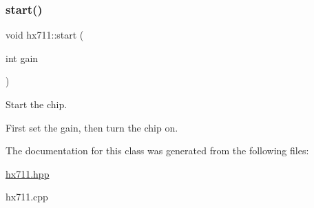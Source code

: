 \subsubsection{\texorpdfstring{start()}{start()}\hspace{0.1cm}{\footnotesize\ttfamily [2/2]}}
{\footnotesize\ttfamily void hx711\+::start (\begin{DoxyParamCaption}\item[{int}]{gain }\end{DoxyParamCaption})\hspace{0.3cm}{\ttfamily [virtual]}}



Start the chip. 

First set the gain, then turn the chip on. 

The documentation for this class was generated from the following files\+:\begin{DoxyCompactItemize}
\item 
\hyperlink{hx711_8hpp}{hx711.\+hpp}\item 
hx711.\+cpp\end{DoxyCompactItemize}
